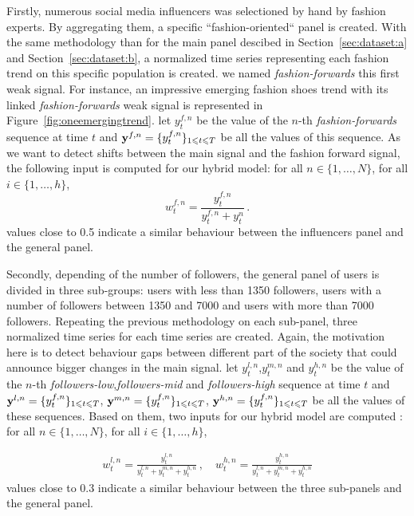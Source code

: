 \documentclass{article} %
\newcommand{\ts}{y}
\newcommand{\fullts}{{\bf \ts}}
\newcommand{\lag}{h}
\newcommand{\ws}{w}
\begin{document}
Firstly, numerous social media influencers was selectioned by hand by fashion experts. By aggregating them, a specific ``fashion-oriented`` panel is created. With the same methodology than for the main panel descibed in Section~\ref{sec:dataset:a} and Section~\ref{sec:dataset:b}, a normalized time series representing each fashion trend on this specific population is created. we named \textit{fashion-forwards} this first weak signal. For instance, an impressive emerging fashion shoes trend with its linked \textit{fashion-forwards} weak signal is represented in Figure~\ref{fig:oneemergingtrend}. 
let $\ts_t^{f,n}$ be the value of the $n$-th \textit{fashion-forwards} sequence at time $t$ and  $\fullts^{f,n} = \{\ts_t^{f,n}\}_{1\leqslant t \leqslant T}$ be all the values of this sequence.
As we want to detect shifts between the main signal and the fashion forward signal, the following input is computed for our hybrid model: 
for all $n \in \{1,\ldots,N\}$, for all $i \in \{1,\ldots,\lag\}$,
$$
\ws^{f,n}_{t} = \frac{\ts_t^{f,n}}{\ts_t^{f,n}+\ts_t^{n}}\,.
$$
values close to 0.5 indicate a similar behaviour between the influencers panel and the general panel.


Secondly, depending of the number of followers, the general panel of users is divided in three sub-groups: users with less than 1350 followers, users with a number of followers between 1350 and 7000 and users with more than 7000 followers. Repeating the previous methodology on each sub-panel, three normalized time series for each time series are created.  Again, the motivation here is to detect behaviour gaps between different part of the society that could announce bigger changes in the main signal. let $\ts_t^{l,n}$,$\ts_t^{m,n}$ and $\ts_t^{h,n}$ be the value of the $n$-th \textit{followers-low},\textit{followers-mid} and \textit{followers-high} sequence at time $t$ and  $\fullts^{l,n} = \{\ts_t^{f,n}\}_{1\leqslant t \leqslant T}$, $\fullts^{m,n} = \{\ts_t^{f,n}\}_{1\leqslant t \leqslant T}$, $\fullts^{h,n} = \{\ts_t^{f,n}\}_{1\leqslant t \leqslant T}$ be all the values of these sequences. Based on them, two inputs for our hybrid model are computed  : for all $n \in \{1,\ldots,N\}$, for all $i \in \{1,\ldots,\lag\}$,

\begin{align*}
\ws^{l,n}_{t} = \frac{\ts_t^{l,n}}{\ts_t^{l,n}+\ts_t^{m,n}+\ts_t^{h,n}}\,,\quad \ws^{h,n}_{t} = \frac{\ts_t^{h,n}}{\ts_t^{l,n}+\ts_t^{m,n}+\ts_t^{h,n}}
\end{align*}  
values close to 0.3 indicate a similar behaviour between the three sub-panels and the general panel.
\end{document}
